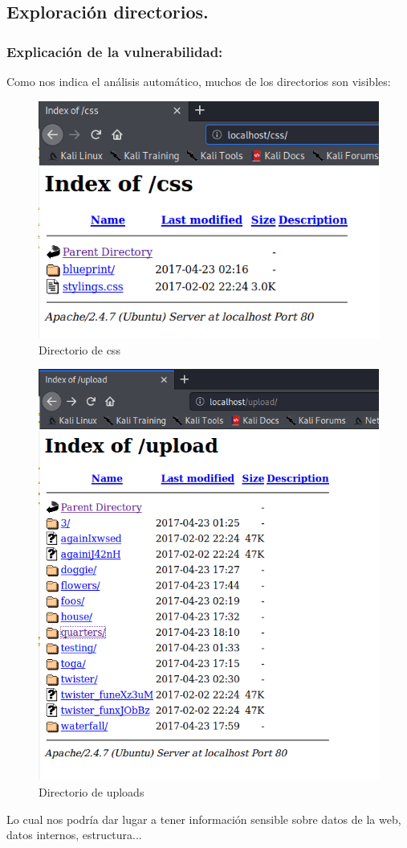 \documentclass[12pt,twoside]{article}
\begin{document}
\subsection{Exploración directorios.}
\subsubsection*{Explicación de la vulnerabilidad:}
Como nos indica el análisis automático, muchos de los directorios son visibles:
\begin{figure}[H]
    \centering
    \includegraphics[scale=0.5]{./imagenes/directorios_1}
    \caption{Directorio de css}
\end{figure}
\begin{figure}[H]
    \centering
    \includegraphics[scale=0.5]{./imagenes/directorios_2}
    \caption{Directorio de uploads}
\end{figure}
Lo cual nos podría dar lugar a tener información sensible sobre datos de la web, datos internos, estructura...
\end{document}
